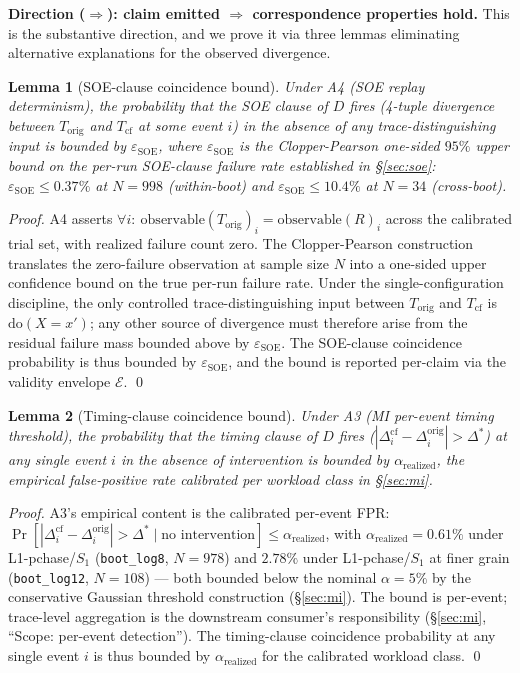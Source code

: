 \documentclass[conference]{IEEEtran}
\newtheorem{lemma}{Lemma}
\newcommand{\Korig}{T_\text{orig}}
\newcommand{\Tcf}{T_\text{cf}}
\newcommand{\Dstar}{\Delta^{*}}
\newcommand{\arealized}{\alpha_\text{realized}}
\newcommand{\dox}[1]{\text{do}(X{=}#1)}
\newcommand{\epsSOE}{\varepsilon_\text{SOE}}
\begin{document}
\textbf{Direction ($\Rightarrow$): claim emitted $\Rightarrow$
correspondence properties hold.} This is the substantive
direction, and we prove it via three lemmas eliminating
alternative explanations for the observed divergence.

\begin{lemma}[SOE-clause coincidence bound]
\label{lem:coincidence-soe}
Under A4 (SOE replay determinism), the probability that the SOE
clause of $D$ fires (4-tuple divergence between $\Korig$ and
$\Tcf$ at some event $i$) in the absence of any
trace-distinguishing input is bounded by $\epsSOE$, where
$\epsSOE$ is the Clopper-Pearson one-sided $95\%$ upper bound on
the per-run SOE-clause failure rate established in
\S\ref{sec:soe}: $\epsSOE \leq 0.37\%$ at $N{=}998$ (within-boot)
and $\epsSOE \leq 10.4\%$ at $N{=}34$ (cross-boot).
\end{lemma}

\textit{Proof.} A4 asserts
$\forall i:\ \text{observable}(\Korig)_i = \text{observable}(R)_i$
across the calibrated trial set, with realized failure count zero.
The Clopper-Pearson construction translates the zero-failure
observation at sample size $N$ into a one-sided upper confidence
bound on the true per-run failure rate. Under the
single-configuration discipline, the only controlled
trace-distinguishing input between $\Korig$ and $\Tcf$ is
$\dox{x'}$; any other source of divergence must therefore arise
from the residual failure mass bounded above by $\epsSOE$. The
SOE-clause coincidence probability is thus bounded by $\epsSOE$,
and the bound is reported per-claim via the validity envelope
$\mathcal{E}$. \qed

\begin{lemma}[Timing-clause coincidence bound]
\label{lem:coincidence-timing}
Under A3 (MI per-event timing threshold), the probability that
the timing clause of $D$ fires
($|\Delta_i^{\text{cf}} - \Delta_i^{\text{orig}}| > \Dstar$) at
any single event $i$ in the absence of intervention is bounded by
$\arealized$, the empirical false-positive rate calibrated per
workload class in \S\ref{sec:mi}.
\end{lemma}

\textit{Proof.} A3's empirical content is the calibrated
per-event FPR: $\Pr[|\Delta_i^{\text{cf}} -
\Delta_i^{\text{orig}}| > \Dstar \mid \text{no intervention}] \leq
\arealized$, with $\arealized = 0.61\%$ under L1-pchase/$S_1$
(\texttt{boot\_log8}, $N{=}978$) and $2.78\%$ under L1-pchase/$S_1$
at finer grain (\texttt{boot\_log12}, $N{=}108$) --- both bounded
below the nominal $\alpha = 5\%$ by the conservative Gaussian
threshold construction (\S\ref{sec:mi}). The bound is per-event;
trace-level aggregation is the downstream consumer's
responsibility (\S\ref{sec:mi}, ``Scope: per-event detection''). The
timing-clause coincidence probability at any single event $i$ is
thus bounded by $\arealized$ for the calibrated workload class.
\qed
\end{document}
